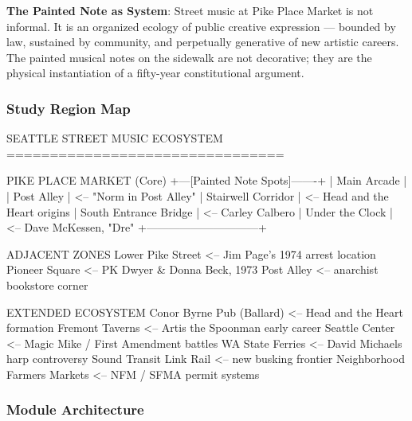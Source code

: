 \documentclass[11pt,letterpaper]{article}
\begin{document}
\textbf{The Painted Note as System}: Street music at Pike Place Market is not informal. It is an organized ecology of public creative expression --- bounded by law, sustained by community, and perpetually generative of new artistic careers. The painted musical notes on the sidewalk are not decorative; they are the physical instantiation of a fifty-year constitutional argument.

\subsubsection{Study Region Map}

\begin{asciibox}
SEATTLE STREET MUSIC ECOSYSTEM
================================

PIKE PLACE MARKET (Core)
+---[Painted Note Spots]-------+
|  Main Arcade                 |
|  Post Alley                  |  <-- "Norm in Post Alley"
|  Stairwell Corridor          |  <-- Head and the Heart origins
|  South Entrance Bridge       |  <-- Carley Calbero
|  Under the Clock             |  <-- Dave McKessen, "Dre"
+------------------------------+

ADJACENT ZONES
  Lower Pike Street  <-- Jim Page's 1974 arrest location
  Pioneer Square     <-- PK Dwyer & Donna Beck, 1973
  Post Alley         <-- anarchist bookstore corner

EXTENDED ECOSYSTEM
  Conor Byrne Pub (Ballard)   <-- Head and the Heart formation
  Fremont Taverns             <-- Artis the Spoonman early career
  Seattle Center              <-- Magic Mike / First Amendment battles
  WA State Ferries            <-- David Michaels harp controversy
  Sound Transit Link Rail     <-- new busking frontier
  Neighborhood Farmers Markets <-- NFM / SFMA permit systems
\end{asciibox}

\subsubsection{Module Architecture}
\end{document}
